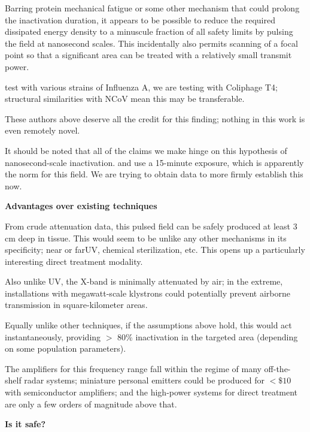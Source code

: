 \documentclass[fleqn,10pt]{paper}
\begin{document}
Barring protein mechanical fatigue \cite{Mechanical2013} or some other mechanism that could prolong the inactivation duration, it appears to be possible to reduce the required dissipated energy density to a minuscule fraction of all safety limits by pulsing the field at nanosecond scales. This incidentally also permits scanning of a focal point so that a significant area can be treated with a relatively small transmit power.

\cite{Efficient2015} test with various strains of Influenza A, we are testing with Coliphage T4; structural similarities with NCoV mean this may be transferable. 

These authors above deserve all the credit for this finding; nothing in this work is even remotely novel.

\begin{autem}
	It should be noted that all of the claims we make hinge on this hypothesis of nanosecond-scale inactivation. \cite{Efficient2015} and \cite{focusing2014} use a 15-minute exposure, which is apparently the norm for this field. We are trying to obtain data to more firmly establish this now.
\end{autem}



{\Large \textbf{Advantages over existing techniques}}

From crude attenuation data, this pulsed field can be safely produced at least 3 cm deep in tissue. This would seem to be unlike any other mechanisms in its specificity; near or far\cite{Germicidal2017}UV, chemical sterilization, etc. This opens up a particularly interesting direct treatment modality.

Also unlike UV, the X-band is minimally attenuated by air; in the extreme, installations with megawatt-scale klystrons could potentially prevent airborne transmission in square-kilometer areas.

Equally unlike other techniques, if the assumptions above hold, this would act instantaneously, providing $>$ 80\% inactivation in the targeted area (depending on some population parameters).

The amplifiers for this frequency range fall within the regime of many off-the-shelf radar systems; miniature personal emitters could be produced for $ < \$10$ with semiconductor amplifiers; and the high-power systems for direct treatment are only a few orders of magnitude above that.

{\Large \textbf{Is it safe?}}
\end{document}
